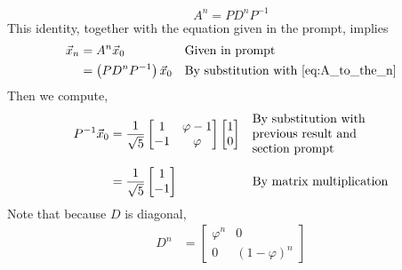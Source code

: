 \documentclass{article}
\newcommand{\reason}[1]{&& \text{#1}}
\begin{document}
\begin{enumerate}
        \begin{equation}
          A^n = PD^{n}P^{-1} \label{eq:A_to_the_n}
        \end{equation}
        This identity, together with the equation given in the prompt, implies
        \begin{align*}
          \vec{x}_n & = A^{n}\vec{x}_0 \reason{Given in prompt}                                                \\
                    & = \left(PD^{n}P^{-1}\right)\vec{x}_0 \reason{By substitution with \eqref{eq:A_to_the_n}}
        \end{align*}
        Then we compute,
        \begin{align*}
          P^{-1}\vec{x}_0 & = \frac{1}{\sqrt{5}}\begin{bmatrix}
                                                  1  & \varphi-1 \\
                                                  -1 & \varphi
                                                \end{bmatrix}\begin{bmatrix}
                                                               1 \\
                                                               0
                                                             \end{bmatrix} \reason{\begin{tabular}[c]{@{}l@{}}By substitution with\\previous result and\\section prompt\end{tabular}} \\[1ex]
                          & = \frac{1}{\sqrt{5}}\begin{bmatrix}
                                                  1 \\
                                                  -1
                                                \end{bmatrix} \reason{By matrix multiplication}
        \end{align*}
        Note that because $D$ is diagonal,
        \begin{align*}
          D^n & = \begin{bmatrix}
                    \varphi^n & 0             \\
                    0         & (1-\varphi)^n
                  \end{bmatrix}

\end{align*}
\end{enumerate}
\end{document}
